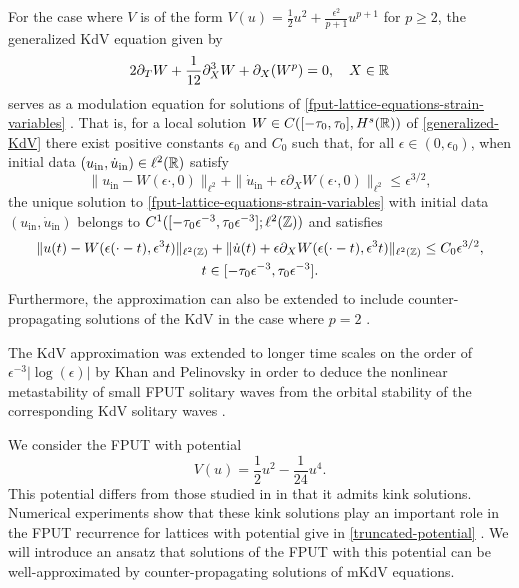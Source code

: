 For the case where \(V\) is of the form \(V(u) = \frac 1 2 u^2 + \frac{\epsilon^2}{p+1} u^{p+1}\) for \(p\geq 2\), the generalized KdV equation given by 
\begin{equation}\label{generalized-KdV}
	2 \partial_TW + \frac 1 {12} \partial_X^3 W + \partial_X(W^p) = 0,\quad X\in\mathbb{R}
\end{equation} 
serves as a modulation equation for solutions of \cref{fput-lattice-equations-strain-variables} \cite{bambusi2006metastability,friesecke1999solitary}. That is, for a local solution \(W\in C([-\tau_0,\tau_0],H^s(\mathbb{R}))\) of \cref{generalized-KdV} there exist positive constants \(\epsilon_0\) and \(C_0\) such that, for all \(\epsilon \in (0,\epsilon_0)\), when initial data \((u_{\mathrm{in} }, \dot u_{\mathrm{in}})\in\ell^2(\mathbb{R})\) satisfy
\begin{equation*}
	\|u_{\mathrm{in}} - W(\epsilon\cdot, 0) \|_{\ell^2} + \| \dot u_{\mathrm{in}} + \epsilon \partial_X W(\epsilon\cdot, 0) \|_{\ell^2} \leq \epsilon^{3/2},
\end{equation*}
the unique solution to \cref{fput-lattice-equations-strain-variables} with initial data \((u_{\mathrm{in} }, \dot u_{\mathrm{in}})\) belongs to \(C^1([-\tau_0\epsilon^{-3}, \tau_0 \epsilon^{-3}];\allowbreak \ell^2(\mathbb{Z}))\) and satisfies 
\begin{multline}
	\|u(t) - W(\epsilon (\cdot - t),\epsilon^3 t)\|_{\ell^2(\mathbb{Z})} + \| \dot u(t) + \epsilon \partial_X W(\epsilon(\cdot - t), \epsilon^3 t) \|_{\ell^2(\mathbb{Z})} \leq C_0 \epsilon^{3/2}, \\ t\in[-\tau_0 \epsilon^{-3},\tau_0 \epsilon^{-3}].
\end{multline}
Furthermore, the approximation can also be extended to include counter-propagating solutions of the KdV in the case where \(p=2\) \cite{schneider2000counter,hong2021korteweg}.

The KdV approximation was extended to longer time scales on the order of \(\epsilon^{-3}|\log(\epsilon)|\) by Khan and Pelinovsky in order to deduce the nonlinear metastability of small FPUT solitary waves from the orbital stability of the corresponding KdV solitary waves \cite{khan2017long}.

We consider the FPUT with potential
\begin{equation}\label{truncated-potential}
	V(u) = \frac 1 2 u^2 - \frac{1} {24} u^4.
\end{equation}
This potential differs from those studied in \cite{khan2017long} in that it admits kink solutions. Numerical experiments show that these kink solutions play an important role in the FPUT recurrence for lattices with potential give in \cref{truncated-potential} \cite{pace2019beta}. We will introduce an ansatz that solutions of the FPUT with this potential can be well-approximated by counter-propagating solutions of mKdV equations.

